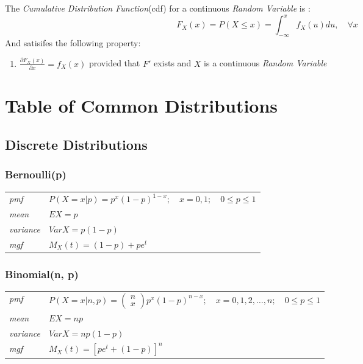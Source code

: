 \documentclass[12pt]{article}
\begin{document}
The \emph{Cumulative Distribution Function}(cdf) for a continuous \emph{Random Variable} is \cite[p.5]{classnotes.4}:
$$F_X(x)=P(X \leq x) = \int_{-\infty}^{x}f_X(u)du, \quad \forall x$$
And satisifes the following property:
\begin{enumerate}
\item $\frac{\partial F_X(x)}{\partial x}=f_X(x)$ provided that $F'$ exists and $X$ is a continuous \emph{Random Variable}
\end{enumerate}

\section*{Table of Common Distributions}
\subsection*{Discrete Distributions}
\subsubsection*{Bernoulli(p) \cite[p. 621]{StatisticalInference}}
\begin{tabularx}{\textwidth}{ l X }
\emph{pmf} & $P(X=x|p)=p^x(1-p)^{1-x}; \quad x=0, 1; \quad 0 \leq p \leq 1$ \\
\emph{mean} & $EX=p$ \\
\emph{variance} & $Var X =p(1-p)$ \\
\emph{mgf} & $M_X(t)=(1-p)+pe^t$ \\
\end{tabularx}

\subsubsection*{Binomial(n, p) \cite[p. 621]{StatisticalInference}}
\begin{tabularx}{\textwidth}{ l X }
\emph{pmf} & $P(X=x|n, p)=\begin{pmatrix}
n \\
x
\end{pmatrix}p^x(1-p)^{n-x}; \quad x=0, 1, 2, \dots, n; \quad 0 \leq p \leq 1$ \\
\emph{mean} & $EX=np$ \\
\emph{variance} & $Var X =np(1-p)$ \\
\emph{mgf} & $M_X(t)=[pe^t + (1-p)]^n$ \\
\end{tabularx}

\newpage


\end{document}
